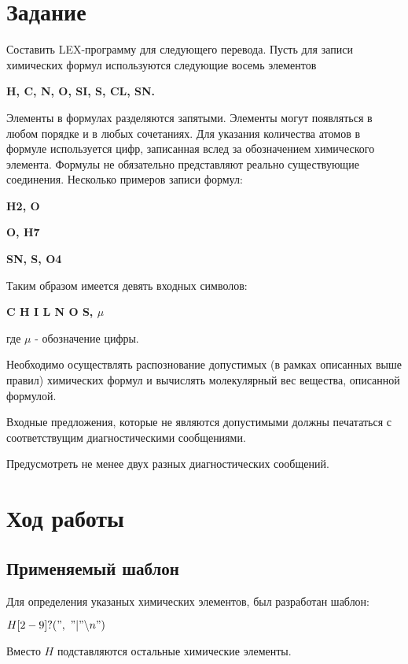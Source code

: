 





\section{Задание}
    Составить LEX-программу для следующего перевода.
    Пусть для записи химических формул используются следующие восемь элементов
    
    \textbf{H, C, N, O, SI, S, CL, SN.}

    Элементы в формулах разделяются запятыми.
    Элементы могут появляться в любом порядке и в любых сочетаниях.
    Для указания количества атомов в формуле используется цифр,
    записанная вслед за обозначением химического элемента.
    Формулы не обязательно представляют реально существующие соединения. 
    Несколько примеров записи формул:

    \textbf{H2, O}

    \textbf{O, H7}

    \textbf{SN, S, O4}

    Таким образом имеется девять входных символов:

    \textbf{C H I L N O S, $\mu$}

    где $\mu$ - обозначение цифры.

    Необходимо осуществлять распознование допустимых 
    (в рамках описанных выше правил) химических формул и
    вычислять молекулярный вес вещества, описанной формулой.
    
    Входные предложения, которые не являются допустимыми должны печататься
    с соответствущим диагностическими сообщениями.

    Предусмотреть не менее двух разных диагностических сообщений.


\section{Ход работы}

\subsection{Применяемый шаблон}

    Для определения указаных химических элементов, был разработан шаблон:

    $H[2-9]?("{},\ "{}|"\backslash n")$

    Вместо $H$ подставляются остальные химические элементы.

